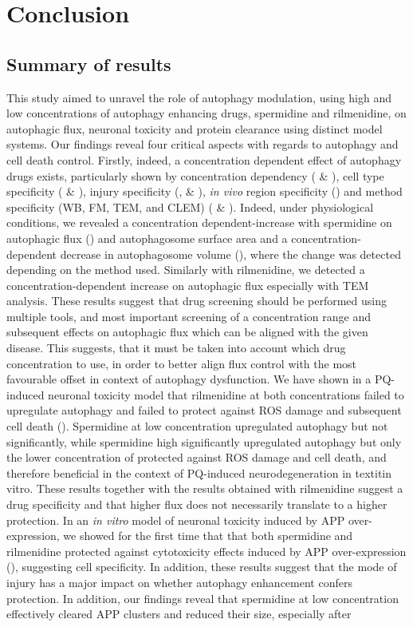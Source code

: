 \chapter{Conclusion}
\section{Summary of results}
This study aimed to unravel the role of autophagy modulation, using high and low concentrations of autophagy enhancing drugs, spermidine and rilmenidine, on autophagic flux, neuronal toxicity and protein clearance using distinct model systems. Our findings reveal four critical aspects with regards to autophagy and cell death control. Firstly, indeed, a concentration dependent effect of autophagy drugs exists, particularly shown by concentration dependency ( \& ), cell type specificity ( \& ), injury specificity (,  \& ), \textit{in vivo} region specificity () and method specificity (WB, FM, TEM, and CLEM) ( \& ). Indeed, under physiological conditions, we revealed a concentration dependent-increase with spermidine on autophagic flux () and autophagosome surface area and a concentration-dependent decrease in autophagosome volume (), where the change was detected depending on the method used. Similarly with rilmenidine, we detected a concentration-dependent increase on autophagic flux especially with TEM analysis. These results suggest that drug screening should be performed using multiple tools, and most important screening of a concentration range and subsequent effects on autophagic flux which can be aligned with the given disease. This suggests, that it must be taken into account which drug concentration to use, in order to better align flux control with the most favourable offset in context of autophagy dysfunction. We have shown in a PQ-induced neuronal toxicity model that rilmenidine at both concentrations failed to upregulate autophagy and failed to protect against ROS damage and subsequent cell death (). Spermidine at low concentration upregulated autophagy but not significantly, while spermidine high significantly upregulated autophagy but only the lower concentration of protected against ROS damage and cell death, and therefore beneficial in the context of PQ-induced neurodegeneration in textit{in vitro}. These results together with the results obtained with rilmenidine suggest a drug specificity and that higher flux does not necessarily translate to a higher protection. In an \textit{in vitro} model of neuronal toxicity induced by APP over-expression, we showed for the first time that that both spermidine and rilmenidine protected against cytotoxicity effects induced by APP over-expression (), suggesting cell specificity. In addition, these results suggest that the mode of injury has a major impact on whether autophagy enhancement  confers protection. In addition, our findings reveal that spermidine at low concentration effectively cleared APP clusters and reduced their size, especially after 